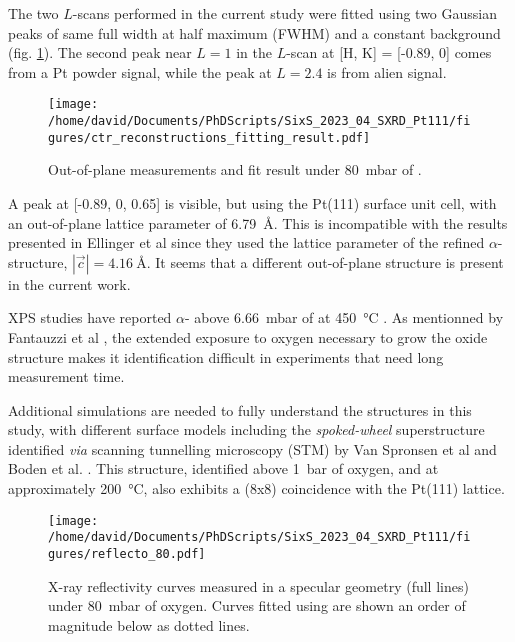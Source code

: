 The two $L$-scans performed in the current study were fitted using two Gaussian peaks of same full width at half maximum (FWHM) and a constant background (fig. \ref{fig:LScans80Fit}).
The second peak near $L=1$ in the $L$-scan at [H, K] = [-0.89, 0] comes from a Pt powder signal, while the peak at $L=2.4$ is from alien signal.

\begin{figure}[!htb]
    \centering
    \texttt{[image: /home/david/Documents/PhDScripts/SixS\_2023\_04\_SXRD\_Pt111/figures/ctr\_reconstructions\_fitting\_result.pdf]}
    \caption{
        Out-of-plane measurements and fit result under \qty{80}{\milli\bar} of .
    }
    \label{fig:LScans80Fit}
\end{figure}

A peak at [-0.89, 0, 0.65] is visible, but using the Pt(111) surface unit cell, with an out-of-plane lattice parameter of \qty{6.79}{\angstrom}.
This is incompatible with the results presented in Ellinger et al \parencite*{Ellinger2008} since they used the lattice parameter of the refined $\alpha$- structure, $|\vec{c}|=\qty{4.16}{\angstrom}$.
It seems that a different out-of-plane structure is present in the current work.

XPS studies have reported $\alpha$- above \qty{6.66}{\milli\bar} of  at \qty{450}{\degreeCelsius} \parencite{Miller2011, Miller2014}.
As mentionned by Fantauzzi et al \parencite*{Fantauzzi2017}, the extended exposure to oxygen necessary to grow the oxide structure makes it identification difficult in experiments that need long measurement time.

Additional simulations are needed to fully understand the structures in this study, with different surface models including the \textit{spoked-wheel} superstructure identified \textit{via} scanning tunnelling microscopy (STM) by Van Spronsen et al \parencite*{VanSpronsen2017} and Boden et al. \parencite*{Boden2022}.
This structure, identified above \qty{1}{\bar} of oxygen, and at approximately \qty{200}{\degreeCelsius}, also exhibits a (8x8) coincidence with the Pt(111) lattice.

\begin{figure}[!htb]
    \centering
    \texttt{[image: /home/david/Documents/PhDScripts/SixS\_2023\_04\_SXRD\_Pt111/figures/reflecto\_80.pdf]}
    \caption{
    	X-ray reflectivity curves measured in a specular geometry (full lines) under \qty{80}{\milli\bar} of oxygen.
    	Curves fitted using  are shown an order of magnitude below as dotted lines.
    }
    \label{fig:Reflecto80}
\end{figure}

